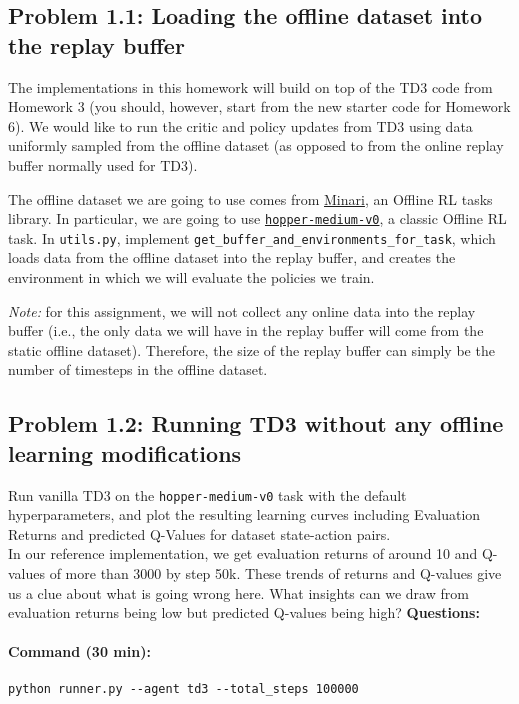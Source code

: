 \documentclass[12pt]{article}
\begin{document}
\subsection*{Problem 1.1: Loading the offline dataset into the replay buffer}

The implementations in this homework will build on top of the TD3 code from Homework 3 (you should, however, start from the new starter code for Homework 6). We would like to run the critic and policy updates from TD3 using data uniformly sampled from the offline dataset (as opposed to from the online replay buffer normally used for TD3).

The offline dataset we are going to use comes from \href{https://minari.farama.org/}{Minari}, an Offline RL tasks library. In particular, we are going to use \href{https://minari.farama.org/datasets/mujoco/hopper/medium-v0/}{\texttt{hopper-medium-v0}}, a classic Offline RL task. In \texttt{utils.py}, implement \texttt{get_buffer_and_environments_for_task}, which loads data from the offline dataset into the replay buffer, and creates the environment in which we will evaluate the policies we train.

\textit{Note:} for this assignment, we will not collect any online data into the replay buffer (i.e., the only data we will have in the replay buffer will come from the static offline dataset). Therefore, the size of the replay buffer can simply be the number of timesteps in the offline dataset.


\subsection*{Problem 1.2: Running TD3 without any offline learning modifications}

Run vanilla TD3 on the \texttt{hopper-medium-v0} task with the default hyperparameters, and plot the resulting learning curves including Evaluation Returns and predicted Q-Values for dataset state-action pairs.\\

In our reference implementation, we get evaluation returns of around 10 and Q-values of more than 3000 by step 50k. These trends of returns and Q-values give us a clue about what is going wrong here. What insights can we draw from evaluation returns being low but predicted Q-values being high? \textbf{Questions:} 

\paragraph{Command (30 min):}
\begin{verbatim}
python runner.py --agent td3 --total_steps 100000
\end{verbatim}
\end{document}
